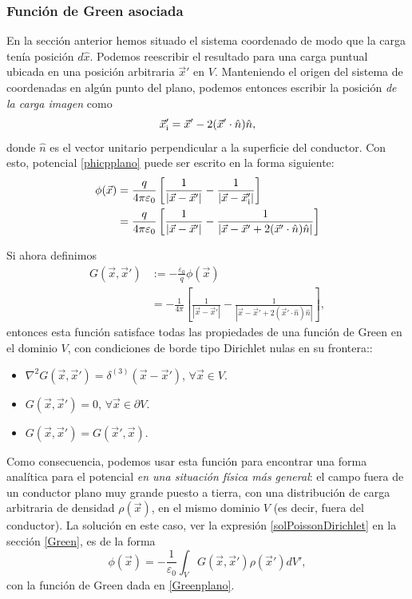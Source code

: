 \subsubsection{Función de Green asociada}
En la sección anterior hemos situado el sistema coordenado de modo que la carga tenía posición $d\hat{x}$. Podemos reescribir el resultado para una carga puntual ubicada en una posición arbitraria $\vec{x}'$ en $V$. Manteniendo el origen del sistema de coordenadas en algún punto del plano, podemos entonces escribir la posición \textit{de la carga imagen} como
\begin{equation}
\vec{x}'_{\rm i} = \vec{x}'-2(\vec{x}'\cdot\hat{n})\hat{n},
\end{equation}
donde $\hat{n}$ es el vector unitario perpendicular a la superficie del conductor. Con esto, potencial \eqref{phicpplano} puede ser escrito en la forma siguiente:
\begin{align}
\phi(\vec{x}) &= \frac{q}{4\pi\varepsilon_0}\left[\frac{1}{\left|\vec{x}-\vec{x}'\right|}-\frac{1}{\left|\vec{x}-\vec{x}'_{\rm i}\right|}\right] \\
&= \frac{q}{4\pi\varepsilon_0}\left[\frac{1}{\left|\vec{x}-\vec{x}'\right|}-\frac{1}{\left|\vec{x}-\vec{x}'+2(\vec{x}'\cdot\hat{n})\hat{n}\right|}\right]
\end{align}

Si ahora definimos
\begin{align}
G(\vec{x},\vec{x}') &:= -\frac{\varepsilon_0}{q}\phi(\vec{x}) \\
&= -\frac{1}{4\pi}\left[\frac{1}{\left|\vec{x}-\vec{x}'\right|}-\frac{1}{\left|\vec{x}-\vec{x}'+2(\vec{x}'\cdot\hat{n})\hat{n}\right|}\right], \label{Greenplano}
\end{align}
entonces esta función satisface todas las propiedades de una función de Green en el dominio $V$, con condiciones de borde tipo Dirichlet nulas en su frontera::
\begin{itemize}
\item $\nabla^2G(\vec{x},\vec{x}')=\delta^{(3)}(\vec{x}-\vec{x}')$, $\forall \vec{x}\in V$.
\item $G(\vec{x},\vec{x}')=0$, $\forall \vec{x}\in \partial V$.
\item $G(\vec{x},\vec{x}')=G(\vec{x}',\vec{x})$.
\end{itemize}

Como consecuencia, podemos usar esta función para encontrar una forma analítica para el potencial \textit{en una situación física más general}: el campo fuera de un conductor plano muy grande puesto a tierra, con una distribución de carga arbitraria de densidad $\rho(\vec{x})$, en el mismo dominio $V$ (es decir, fuera del conductor). La solución en este caso, ver la expresión \ref{solPoissonDirichlet} en la sección \ref{Green}, es de la forma
\begin{equation}
\phi(\vec{x}) = -\frac{1}{\varepsilon_0}\int_VG(\vec{x},\vec{x}') \rho(\vec{x}')dV',
\end{equation}
con la función de Green dada en \ref{Greenplano}.
